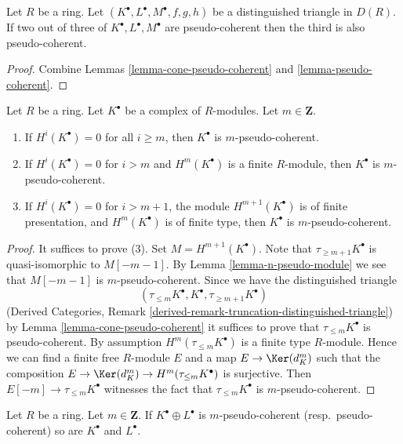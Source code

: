 \begin{lemma}
\label{lemma-two-out-of-three-pseudo-coherent}
Let $R$ be a ring. Let $(K^\bullet, L^\bullet, M^\bullet, f, g, h)$
be a distinguished triangle in $D(R)$. If two out of three of
$K^\bullet, L^\bullet, M^\bullet$ are
pseudo-coherent then the third is also pseudo-coherent.
\end{lemma}

\begin{proof}
Combine
Lemmas \ref{lemma-cone-pseudo-coherent} and \ref{lemma-pseudo-coherent}.
\end{proof}

\begin{lemma}
\label{lemma-recognize-pseudo-coherent}
Let $R$ be a ring. Let $K^\bullet$ be a complex of $R$-modules.
Let $m \in \mathbf{Z}$.
\begin{enumerate}
\item If $H^i(K^\bullet) = 0$ for all $i \geq m$, then
$K^\bullet$ is $m$-pseudo-coherent.
\item If $H^i(K^\bullet) = 0$ for $i > m$ and $H^m(K^\bullet)$ is
a finite $R$-module, then $K^\bullet$ is $m$-pseudo-coherent.
\item If $H^i(K^\bullet) = 0$ for $i > m + 1$, the module
$H^{m + 1}(K^\bullet)$ is of finite presentation, and
$H^m(K^\bullet)$ is of finite type, then $K^\bullet$ is
$m$-pseudo-coherent.
\end{enumerate}
\end{lemma}

\begin{proof}
It suffices to prove (3). Set $M = H^{m + 1}(K^\bullet)$.
Note that $\tau_{\geq m + 1}K^\bullet$ is quasi-isomorphic to
$M[- m - 1]$. By
Lemma \ref{lemma-n-pseudo-module}
we see that $M[- m - 1]$ is $m$-pseudo-coherent. Since we have
the distinguished triangle
$$
(\tau_{\leq m}K^\bullet, K^\bullet, \tau_{\geq m + 1}K^\bullet)
$$
(Derived Categories, Remark
\ref{derived-remark-truncation-distinguished-triangle}) by
Lemma \ref{lemma-cone-pseudo-coherent}
it suffices to prove that $\tau_{\leq m}K^\bullet$ is pseudo-coherent.
By assumption $H^m(\tau_{\leq m}K^\bullet)$ is a finite type $R$-module.
Hence we can find a finite free $R$-module $E$ and a map
$E \to \Ker(d_K^m)$ such that the composition
$E \to \Ker(d_K^m) \to H^m(\tau_{\leq m}K^\bullet)$ is surjective.
Then $E[-m] \to \tau_{\leq m}K^\bullet$ witnesses the fact
that $\tau_{\leq m}K^\bullet$ is $m$-pseudo-coherent.
\end{proof}

\begin{lemma}
\label{lemma-summands-pseudo-coherent}
Let $R$ be a ring. Let $m \in \mathbf{Z}$. If $K^\bullet \oplus L^\bullet$
is $m$-pseudo-coherent (resp.\ pseudo-coherent)
so are $K^\bullet$ and $L^\bullet$.
\end{lemma}

